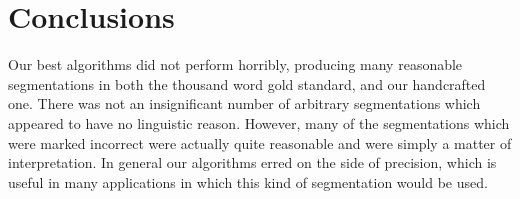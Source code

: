 \documentclass[11pt]{article}
\begin{document}
\section{Conclusions}
Our best algorithms did not perform horribly, producing many reasonable
segmentations in both the thousand word gold standard, and our handcrafted
one. There was not an insignificant number of arbitrary segmentations
which appeared to have no linguistic reason. However, many of the segmentations
which were marked incorrect were actually quite reasonable and were simply
a matter of interpretation. In general our algorithms erred on the side of 
precision, which is useful in many applications in which this kind of 
segmentation would be used.



\end{document}

